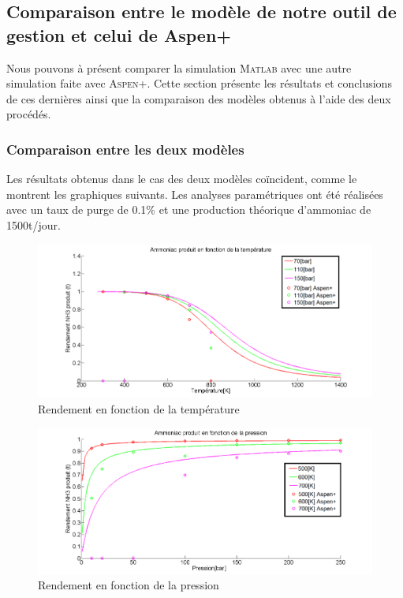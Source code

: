 
\subsection{Comparaison entre le modèle de notre outil de gestion et celui de Aspen+}
Nous pouvons à présent comparer la simulation \textsc{Matlab} avec une autre 
simulation faite avec \textsc{Aspen+}. Cette section présente les résultats et conclusions de ces dernières ainsi que la comparaison des modèles obtenus à l'aide des deux procédés.

\subsubsection{Comparaison entre les deux modèles}
Les résultats obtenus dans le cas des deux modèles coïncident, comme le montrent les graphiques suivants. Les analyses paramétriques ont été réalisées avec un taux de purge de 0.1\% et une production théorique d'ammoniac de \unit{1500}{t/jour}.

\begin{figure}[ht!]
 \centering
 \includegraphics[scale=0.35]{GrapheCompT.png}
 \caption{Rendement en fonction de la température}
 \label{scheme}
\end{figure}

\begin{figure}[ht!]
 \centering
 \includegraphics[scale=0.35]{GrapheCompP.png}
 \caption{Rendement en fonction de la pression}
 \label{scheme}
\end{figure}

